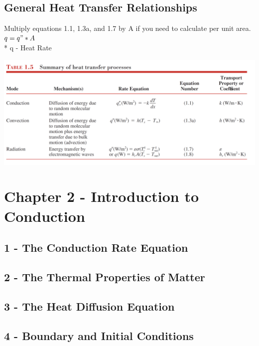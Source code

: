 \documentclass[10pt,landscape]{article}
\newenvironment{Figure}
     {\par\medskip\noindent\minipage{\linewidth}}
     {\endminipage\par\medskip}
\begin{document}
\begin{multicols}{3}
\subsection{General Heat Transfer Relationships}
Multiply equations 1.1, 1.3a, and 1.7 by A if you need to calculate per unit area. $q=q"*A$\\*
q - Heat Rate 
\begin{Figure}
    \centering
    \includegraphics[width=\linewidth]{Table_1_5.png}
\end{Figure}

\section{Chapter 2 - Introduction to Conduction}
\subsection{1 - The Conduction Rate Equation}
\subsection{2 - The Thermal Properties of Matter}
\subsection{3 - The Heat Diffusion Equation}
\subsection{4 - Boundary and Initial Conditions}


\end{multicols}
\end{document}
